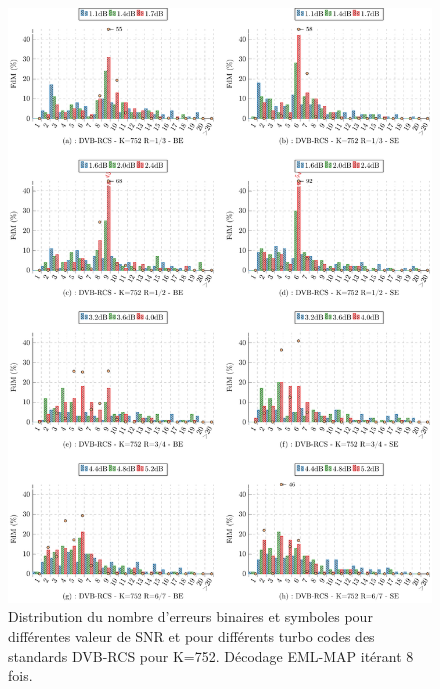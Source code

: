 \begin{figure}[!ht] 
	\centering
	\hspace*{-1cm}
	\includegraphics[width=1.05\textwidth]{main/ch3_fig/be/dvb/tikz/be_752.pdf}
	\caption{Distribution du nombre d'erreurs binaires et symboles pour différentes valeur de SNR et pour différents turbo codes des 
	standards DVB-RCS pour K=752.	Décodage EML-MAP itérant 8 fois. \label{fig:be_dvb752}}
\end{figure}




